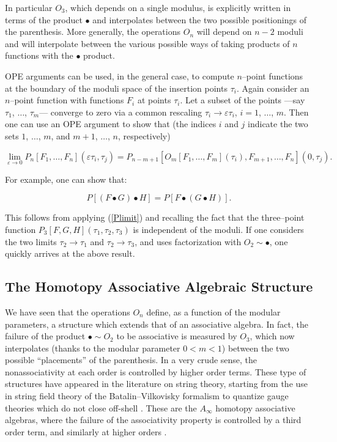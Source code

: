 \documentclass[a4paper,11pt]{article}
\begin{document}
\noindent
In particular $O_{3}$, which depends on a single modulus, is explicitly
written in terms of the product $\bullet$ and interpolates between the two
possible positionings of the parenthesis. More generally, the operations
$O_{n}$ will depend on $n-2$ moduli and will interpolate between the
various possible ways of taking products of $n$ functions with the
$\bullet$ product.

OPE arguments can be used, in the general case, to compute $n$--point
functions at the boundary of the moduli space of the insertion points
$\tau_{i}$.  Again consider an $n$--point function with functions $F_{i}$
at points $\tau_{i}$. Let a subset of the points ---say $\tau_{1}$,
$\dots$, $\tau_{m}$--- converge to zero via a common rescaling $\tau_{i}
\rightarrow \varepsilon \tau_{i}$, $i=1$, $\dots$, $m$. Then one can use an
OPE argument to show that (the indices $i$ and $j$ indicate the two sets
$1$, $\dots$, $m$, and $m+1$, $\dots$, $n$, respectively)

\begin{equation} \label{Plimit}
\lim_{\varepsilon \rightarrow 0}P_{n}\left[ F_{1}, \dots, F_{n}\right]
\left( \varepsilon \tau _{i},\tau _{j}\right) =P_{n-m+1}\left[ O_{m}\left[
F_{1}, \dots, F_{m}\right] \left( \tau _{i}\right), F_{m+1}, \dots, F_{n} 
\right] \left( 0,\tau _{j}\right) .
\end{equation}

\noindent
For example, one can show that:

$$
P\left[ \left( F\bullet G\right) \bullet H\right] =P\left[ F\bullet \left(
G\bullet H\right) \right] .
$$

\noindent
This follows from applying (\ref{Plimit}) and recalling the fact that the
three--point function $P_{3} \left[ F,G,H \right] \left( \tau_{1},
\tau_{2}, \tau_{3} \right)$ is independent of the moduli. If one considers
the two limits $\tau_{2} \rightarrow \tau_{1}$ and $\tau_{2} \rightarrow
\tau_{3}$, and uses factorization with $O_{2} \sim \bullet$, one quickly
arrives at the above result.


\subsection{The Homotopy Associative Algebraic Structure}


We have seen that the operations $O_n$ define, as a function of the modular
parameters, a structure which extends that of an associative algebra. In
fact, the failure of the product $\bullet \sim O_2$ to be associative is
measured by $O_3$, which now interpolates (thanks to the modular parameter
$0 < m < 1$) between the two possible ``placements'' of the parenthesis. In
a very crude sense, the nonassociativity at each order is controlled by
higher order terms. These type of structures have appeared in the
literature on string theory, starting from the use in string field theory
of the Batalin--Vilkovisky formalism to quantize gauge theories which do
not close off-shell \cite{Lada-Stasheff, Lada-Markl, Zwiebach, GAB}. These 
are the $A_{\infty}$ homotopy associative algebras, where the failure of 
the associativity property is controlled by a third order term, and similarly  
at higher orders \cite{Stasheff}.
\end{document}
